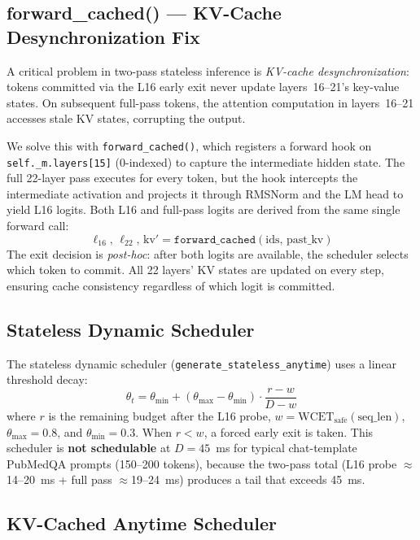 \documentclass[conference]{IEEEtran}
\begin{document}
\subsection{forward\_cached() --- KV-Cache Desynchronization Fix}

A critical problem in two-pass stateless inference is \textit{KV-cache desynchronization}: tokens committed via the L16 early exit never update layers~16--21's key-value states. On subsequent full-pass tokens, the attention computation in layers~16--21 accesses stale KV states, corrupting the output.

We solve this with \texttt{forward\_cached()}, which registers a forward hook on \texttt{self.\_m.layers[15]} (0-indexed) to capture the intermediate hidden state. The full 22-layer pass executes for every token, but the hook intercepts the intermediate activation and projects it through RMSNorm and the LM head to yield L16 logits. Both L16 and full-pass logits are derived from the same single forward call:
\begin{equation}
\ell_{16},\, \ell_{22},\, \text{kv}' = \texttt{forward\_cached}(\text{ids},\, \text{past\_kv})
\end{equation}
The exit decision is \textit{post-hoc}: after both logits are available, the scheduler selects which token to commit. All 22 layers' KV states are updated on every step, ensuring cache consistency regardless of which logit is committed.

\subsection{Stateless Dynamic Scheduler}

The stateless dynamic scheduler (\texttt{generate\_stateless\_anytime}) uses a linear threshold decay:
\begin{equation}
\theta_t = \theta_{\min} + (\theta_{\max} - \theta_{\min}) \cdot \frac{r - w}{D - w}
\label{eq:decay}
\end{equation}
where $r$ is the remaining budget after the L16 probe, $w = \text{WCET}_{\text{safe}}(\text{seq\_len})$, $\theta_{\max} = 0.8$, and $\theta_{\min} = 0.3$. When $r < w$, a forced early exit is taken. This scheduler is \textbf{not schedulable} at $D = 45$~ms for typical chat-template PubMedQA prompts (150--200 tokens), because the two-pass total (L16 probe $\approx$14--20~ms + full pass $\approx$19--24~ms) produces a tail that exceeds 45~ms.

\subsection{KV-Cached Anytime Scheduler}
\end{document}

